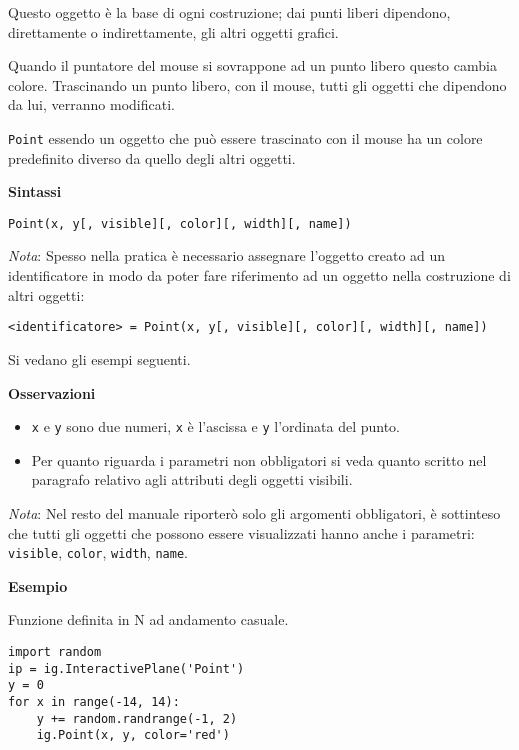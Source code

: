 Questo oggetto è la base di ogni costruzione; dai punti liberi dipendono,
direttamente o indirettamente, gli altri oggetti grafici.

Quando il puntatore del mouse si sovrappone ad un punto libero questo cambia
colore.
Trascinando un punto libero, con il mouse, tutti gli oggetti che dipendono
da lui, verranno modificati.

\texttt{Point} essendo un oggetto che può essere trascinato con il mouse ha un
colore predefinito diverso da quello degli altri oggetti.

\textbf{Sintassi}

\begin{lstlisting}
Point(x, y[, visible][, color][, width][, name])
\end{lstlisting}

\emph{Nota}: 
Spesso nella pratica è necessario assegnare l'oggetto creato ad un
identificatore in modo da poter fare riferimento ad un oggetto nella
costruzione di altri oggetti:

\begin{lstlisting}
<identificatore> = Point(x, y[, visible][, color][, width][, name])
\end{lstlisting}

Si vedano gli esempi seguenti.

\textbf{Osservazioni}

\begin{itemize} [noitemsep]
\item \texttt{x} e \texttt{y} sono due numeri, \texttt{x} è l'ascissa e 
\texttt{y} l'ordinata del punto.
\item Per quanto riguarda i parametri non obbligatori si veda quanto scritto nel
paragrafo relativo agli attributi degli oggetti visibili.
\end{itemize}

\emph{Nota}: 
Nel resto del manuale riporterò solo gli argomenti obbligatori, è sottinteso
che tutti gli oggetti che possono essere visualizzati hanno anche i
parametri: \texttt{visible}, \texttt{color}, \texttt{width}, \texttt{name}.

\textbf{Esempio}

Funzione definita in N ad andamento casuale.

\begin{lstlisting}
import random
ip = ig.InteractivePlane('Point')
y = 0
for x in range(-14, 14):
    y += random.randrange(-1, 2)
    ig.Point(x, y, color='red')
\end{lstlisting}


